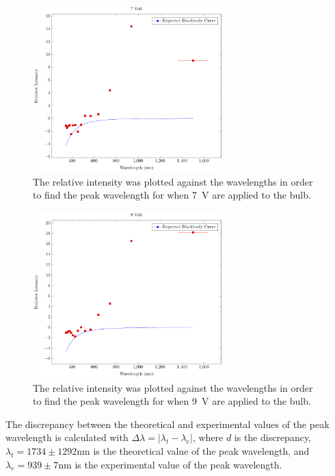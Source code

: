 \documentclass[a4paper]{article}
\begin{document}
\begin{figure}[H]
  \begin{center}
    \includegraphics[width=0.65\textwidth]{P6-BlackbodyRadiation/Plots/7Volt/7volt.pdf}
  \end{center}
  \label{gph:7volt}
  \caption{The relative intensity was plotted against the wavelengths in order
    to find the peak wavelength for when \SI{7}{\volt} are applied to the bulb.}
\end{figure}

\begin{figure}[H]
  \begin{center}
    \includegraphics[width=0.65\textwidth]{P6-BlackbodyRadiation/Plots/9Volt/9volt.pdf}
  \end{center}
  \label{gph:9volt}
  \caption{The relative intensity was plotted against the wavelengths in order
    to find the peak wavelength for when \SI{9}{\volt} are applied to the bulb.}
\end{figure}

\qq The discrepancy between the theoretical and experimental values of the peak
wavelength is calculated with
\( \Delta \lambda = | \lambda_t - \lambda_e | \), where \( d \) is the
discrepancy, \( \lambda_t = 1734 \pm 1292 \si{\nano\meter} \) is the theoretical
value of the peak wavelength, and
\( \lambda_e = 939 \pm 7 \si{\nano\meter} \) is the experimental value of
the peak wavelength.
\end{document}
